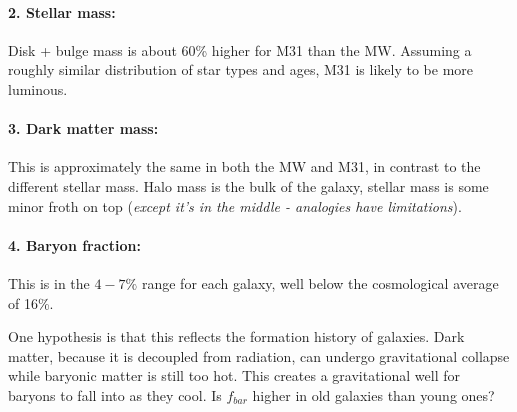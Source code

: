 \paragraph{2. Stellar mass:} Disk + bulge mass is about 60\% higher for M31 than the MW. Assuming a roughly similar distribution of star types and ages, M31 is likely to be more luminous.

\paragraph{3. Dark matter mass:} This is approximately the same in both the MW and M31, in contrast to the different stellar mass. Halo mass is the bulk of the galaxy, stellar mass is some minor froth on top (\textit{except it's in the middle - analogies have limitations}).

\paragraph{4. Baryon fraction:} This is in the $4 - 7\%$ range for each galaxy, well below the cosmological average of 16\%. 

One hypothesis is that this reflects the formation history of galaxies. Dark matter, because it is decoupled from radiation, can undergo gravitational collapse while baryonic matter is still too hot. This creates a gravitational well for baryons to fall into as they cool. Is $f_{bar}$ higher in old galaxies than young ones?


